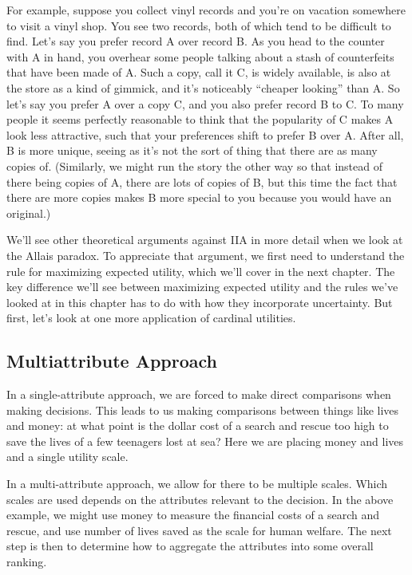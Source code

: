 \documentclass[]{tufte-book}
\begin{document}
For example, suppose you collect vinyl records and you're on vacation somewhere to visit a vinyl shop. You see two records, both of which tend to be difficult to find. Let's say you prefer record A over record B. As you head to the counter with A in hand, you overhear some people talking about a stash of counterfeits that have been made of A. Such a copy, call it C, is widely available, is also at the store as a kind of gimmick, and it's noticeably ``cheaper looking'' than A. So let's say you prefer A over a copy C, and you also prefer record B to C. To many people it seems perfectly reasonable to think that the popularity of C makes A look less attractive, such that your preferences shift to prefer B over A. After all, B is more unique, seeing as it's not the sort of thing that there are as many copies of. (Similarly, we might run the story the other way so that instead of there being copies of A, there are lots of copies of B, but this time the fact that there are more copies makes B more special to you because you would have an original.)

We'll see other theoretical arguments against IIA in more detail when we look at the Allais paradox. To appreciate that argument, we first need to understand the rule for maximizing expected utility, which we'll cover in the next chapter. The key difference we'll see between maximizing expected utility and the rules we've looked at in this chapter has to do with how they incorporate uncertainty. But first, let's look at one more application of cardinal utilities.

\hypertarget{multiattribute-approach}{%
\subsection{Multiattribute Approach}\label{multiattribute-approach}}

In a single-attribute approach, we are forced to make direct comparisons when making decisions. This leads to us making comparisons between things like lives and money: at what point is the dollar cost of a search and rescue too high to save the lives of a few teenagers lost at sea? Here we are placing money and lives and a single utility scale.

In a multi-attribute approach, we allow for there to be multiple scales. Which scales are used depends on the attributes relevant to the decision. In the above example, we might use money to measure the financial costs of a search and rescue, and use number of lives saved as the scale for human welfare. The next step is then to determine how to aggregate the attributes into some overall ranking.
\end{document}
